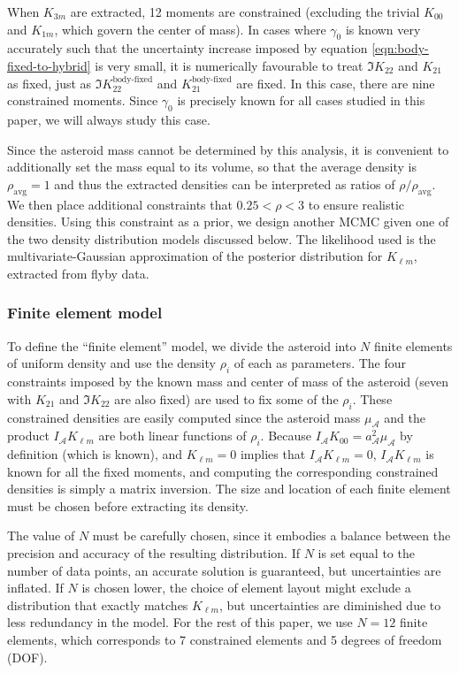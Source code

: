 \documentclass[fleqn,usenatbib]{mnras}
\begin{document}
When $K_{3m}$ are extracted, 12 moments are constrained (excluding the trivial $K_{00}$ and $K_{1m}$, which govern the center of mass). In cases where $\gamma_0$ is known very accurately such that the uncertainty increase imposed by equation \ref{eqn:body-fixed-to-hybrid} is very small, it is numerically favourable to treat $\Im K_{22}$ and $K_{21}$ as fixed, just as $\Im K_{22}^\text{body-fixed}$ and $K_{21}^\text{body-fixed}$ are fixed. In this case, there are nine constrained moments. Since $\gamma_0$ is precisely known for all cases studied in this paper, we will always study this case.

Since the asteroid mass cannot be determined by this analysis, it is convenient to additionally set the mass equal to its volume, so that the average density is $\rho_\text{avg}=1$ and thus the extracted densities can be interpreted as ratios of $\rho / \rho_\text{avg}$. We then place additional constraints that $0.25 < \rho < 3$ to ensure realistic densities. Using this constraint as a prior, we design another MCMC given one of the two density distribution models discussed below. The likelihood used is the multivariate-Gaussian approximation of the posterior distribution for $K_{\ell m}$, extracted from flyby data.



\subsubsection{Finite element model}

To define the ``finite element'' model, we divide the asteroid into $N$ finite elements of uniform density and use the density $\rho_i$ of each as parameters. The four constraints imposed by the known mass and center of mass of the asteroid (seven with $K_{21}$ and $\Im K_{22}$ are also fixed) are used to fix some of the $\rho_i$. These constrained densities are easily computed since the asteroid mass $\mu_\mathcal{A}$ and the product $I_\mathcal{A}K_{\ell m}$ are both linear functions of $\rho_i$. Because $I_\mathcal{A}K_{00} = a_\mathcal{A}^2\mu_\mathcal{A}$ by definition (which is known), and $K_{\ell m} = 0$ implies that $I_\mathcal{A}K_{\ell m} = 0$, $I_\mathcal{A} K_{\ell m}$ is known for all the fixed moments, and computing the corresponding constrained densities is simply a matrix inversion. The size and location of each finite element must be chosen before extracting its density.

The value of $N$ must be carefully chosen, since it embodies a balance between the precision and accuracy of the resulting distribution. If $N$ is set equal to the number of data points, an accurate solution is guaranteed, but uncertainties are inflated. If $N$ is chosen lower, the choice of element layout might exclude a distribution that exactly matches $K_{\ell m}$, but uncertainties are diminished due to less redundancy in the model. For the rest of this paper, we use $N=12$ finite elements, which corresponds to 7 constrained elements and 5 degrees of freedom (DOF).
\end{document}
